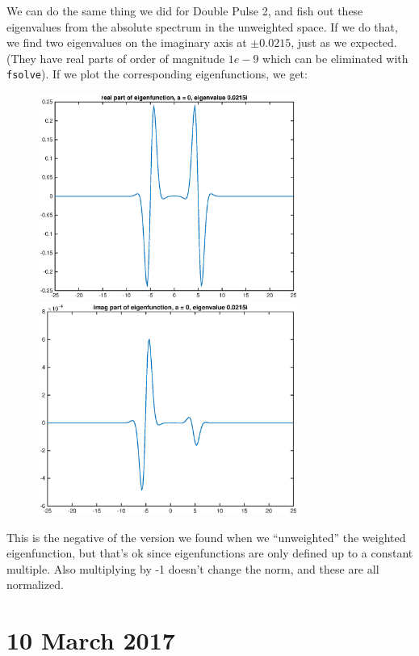 \documentclass[12pt]{article}
\begin{document}
We can do the same thing we did for Double Pulse 2, and fish out these eigenvalues from the absolute spectrum in the unweighted space. If we do that, we find two eigenvalues on the imaginary axis at $\pm 0.0215$, just as we expected. (They have real parts of order of magnitude $1e-9$ which can be eliminated with \texttt{fsolve}). If we plot the corresponding eigenfunctions, we get:
\begin{figure}[H]
\includegraphics[width=8.5cm]{1double4a0eigenfnreal}
\includegraphics[width=8.5cm]{1double4a0eigenfnimag}
\end{figure}
This is the negative of the version we found when we ``unweighted'' the weighted eigenfunction, but that's ok since eigenfunctions are only defined up to a constant multiple. Also multiplying by -1 doesn't change the norm, and these are all normalized.


\section*{10 March 2017}
\end{document}

